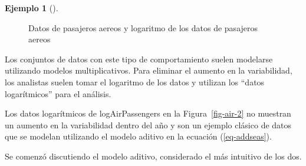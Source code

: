 \documentclass[
  us-letterpaper,
]{scrreprt}
\theoremstyle{plain}
\theoremstyle{definition}
\theoremstyle{definition}
\newtheorem{example}{Ejemplo}[chapter]
\theoremstyle{plain}
\theoremstyle{remark}
\begin{document}
\begin{example}[]
\begin{tcolorbox}
\begin{figure}[H]
\begin{minipage}{0.50\linewidth}
{}


\end{minipage}%
%
\begin{minipage}{0.50\linewidth}



\end{minipage}%

\caption{\label{fig-air}Datos de pasajeros aereos y logaritmo de los
datos de pasajeros aereos}

\end{figure}%

Los conjuntos de datos con este tipo de comportamiento suelen modelarse
utilizando modelos multiplicativos. Para eliminar el aumento en la
variabilidad, los analistas suelen tomar el logaritmo de los datos y
utilizan los ``datos logarítmicos'' para el análisis.

Los datos logarítmicos de logAirPassengers en la Figura~\ref{fig-air-2}
no muestran un aumento en la variabilidad dentro del año y son un
ejemplo clásico de datos que se modelan utilizando el modelo aditivo en
la ecuación (\ref{eq-addseas}).

\end{tcolorbox}

\end{example}

Se comenzó discutiendo el modelo aditivo, considerado el más intuitivo
de los dos.
\end{document}
